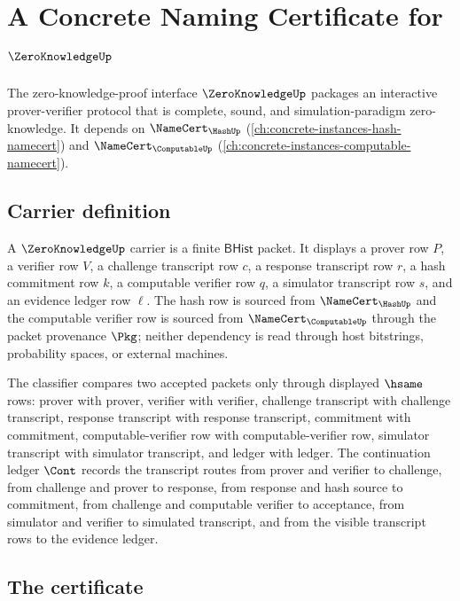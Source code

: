\chapter{A Concrete Naming Certificate for $\ZeroKnowledgeUp$}
\label{ch:concrete-instances-zeroknowledge-namecert}

The zero-knowledge-proof interface $\ZeroKnowledgeUp$ packages an interactive prover-verifier protocol that is complete, sound, and simulation-paradigm zero-knowledge. It depends on $\NameCert_{\HashUp}$ (\autoref{ch:concrete-instances-hash-namecert}) and $\NameCert_{\ComputableUp}$ (\autoref{ch:concrete-instances-computable-namecert}).

\section{Carrier definition}
\label{sec:zeroknowledge-carrier}

A $\ZeroKnowledgeUp$ carrier is a finite $\mathsf{BHist}$ packet. It displays a prover row $P$, a verifier row $V$, a challenge transcript row $c$, a response transcript row $r$, a hash commitment row $k$, a computable verifier row $q$, a simulator transcript row $s$, and an evidence ledger row $\ell$. The hash row is sourced from $\NameCert_{\HashUp}$ and the computable verifier row is sourced from $\NameCert_{\ComputableUp}$ through the packet provenance $\Pkg$; neither dependency is read through host bitstrings, probability spaces, or external machines.

The classifier compares two accepted packets only through displayed $\hsame$ rows: prover with prover, verifier with verifier, challenge transcript with challenge transcript, response transcript with response transcript, commitment with commitment, computable-verifier row with computable-verifier row, simulator transcript with simulator transcript, and ledger with ledger. The continuation ledger $\Cont$ records the transcript routes from prover and verifier to challenge, from challenge and prover to response, from response and hash source to commitment, from challenge and computable verifier to acceptance, from simulator and verifier to simulated transcript, and from the visible transcript rows to the evidence ledger.

\section{The certificate}
\label{sec:zeroknowledge-certificate}

